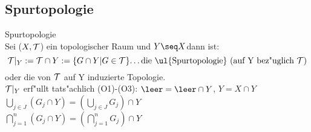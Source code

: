 \subsection{Spurtopologie}
\begin{definition}\label{5.1}Spurtopologie\\
Sei ($X,\mathcal T$) ein topologischer Raum und $Y\seq X$dann ist:
$$\T |_Y :=\T\cap Y:=\{ G\cap Y| G\in\T\}\mbox{\dots die \ul{Spurtopologie} (auf Y bez"uglich $\T$)}$$
oder die von $\mathcal T$ auf Y induzierte Topologie.\\
$\mathcal T |_Y$ erf"ullt tats"achlich (O1)-(O3): $\leer =\leer\cap Y$, $Y=X\cap Y$\vspace*{0.1cm}\\
\hspace*{6.2cm}$\bigcup_{j\in J}(G_j\cap Y)= (\bigcup_{j\in J}G_j)\cap Y$\vspace*{0.2cm}\\
\hspace*{6.2cm}$\bigcap_{j=1}^n(G_j\cap Y)= (\bigcap_{j=1}^nG_j)\cap Y$\\
\end{definition}

